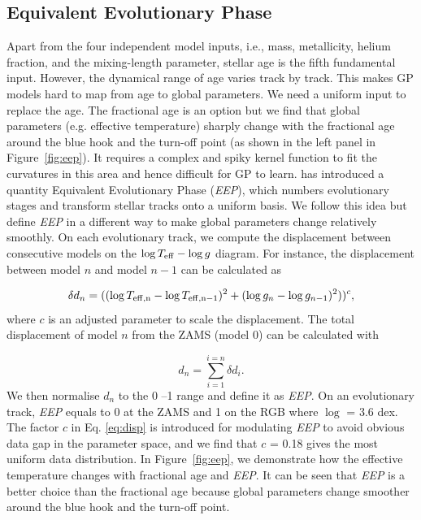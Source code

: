 \subsection{Equivalent Evolutionary Phase}

Apart from the four independent model inputs, i.e., mass, metallicity, helium fraction, and the mixing-length parameter, stellar age is the fifth fundamental input. However, the dynamical range of age varies track by track. This makes GP models hard to map from age to global parameters. 
%
We need a uniform input to replace the age. The fractional age is an option but we find that global parameters (e.g. effective temperature) sharply change with the fractional age around the blue hook and the turn-off point (as shown in the left panel in Figure~\ref{fig:eep}). It requires a complex and spiky kernel function to fit the curvatures in this area and hence difficult for GP to learn. \citet{2016ApJS..222....8D} has introduced a quantity Equivalent Evolutionary Phase ({\it EEP}), which numbers evolutionary stages and transform stellar tracks onto a uniform basis. We follow this idea but define {\it EEP} in a different way to make global parameters change relatively smoothly.
%
On each evolutionary track, we compute the displacement between consecutive models on the $\log T_{\rm eff} - \log g$ diagram. For instance, the displacement between model $n$ and model $n-1$ can be calculated as

\begin{equation}\label{eq:disp}
\delta d_{n} = ((\log T_{\rm eff, n} - \log T_{\rm eff, n-1}) ^{2} + (\log g _{n} - \log g_{n-1})^{2}))^{c},
\end{equation}
where $c$ is an adjusted parameter to scale the displacement. 
%
The total displacement of model $n$ from the ZAMS (model 0) can be calculated with

\begin{equation}
d_{n} = \sum_{i = 1}^{i = n} \delta d_{i} .
\end{equation}
We then normalise $d_{n}$ to the 0 --1 range and define it as {\it EEP}. On an evolutionary track, {\it EEP} equals to 0 at the ZAMS and 1 on the RGB where $\log$ = 3.6 dex. The factor $c$ in Eq. \ref{eq:disp} is introduced for modulating {\it EEP} to avoid obvious data gap in the parameter space, and we find that $c$ = 0.18 gives the most uniform data distribution.
%
In Figure~\ref{fig:eep}, we demonstrate how the effective temperature changes with fractional age and {\it EEP}. It can be seen that {\it EEP} is a better choice than the fractional age because global parameters change smoother around the blue hook and the turn-off point.

